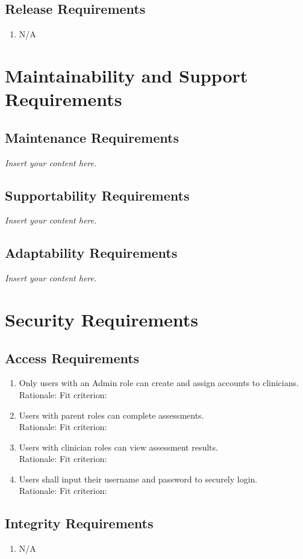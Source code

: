 \documentclass[12pt]{article}
\newcommand{\lips}{\textit{Insert your content here.}}
\begin{document}
\subsection{Release Requirements}
\begin{enumerate}[{OE-R}1. ]
  \item N/A
\end{enumerate}

\section{Maintainability and Support Requirements}
\subsection{Maintenance Requirements}
\lips
\subsection{Supportability Requirements}
\lips
\subsection{Adaptability Requirements}
\lips

\section{Security Requirements}
\subsection{Access Requirements}
\begin{enumerate}[{SR-AC}1. ]
  \item Only users with an Admin role can create and assign accounts to clinicians.\\
  Rationale: 
  Fit criterion: 
  \item Users with parent roles can complete assessments.\\
  Rationale: 
  Fit criterion: 
  \item Users with clinician roles can view assessment results.\\
  Rationale: 
  Fit criterion: 
  \item Users shall input their username and password to securely login.\\
  Rationale: 
  Fit criterion: 
\end{enumerate}
\subsection{Integrity Requirements}
\begin{enumerate}[{SR-INT}1. ]
  \item N/A
\end{enumerate}
\end{document}
